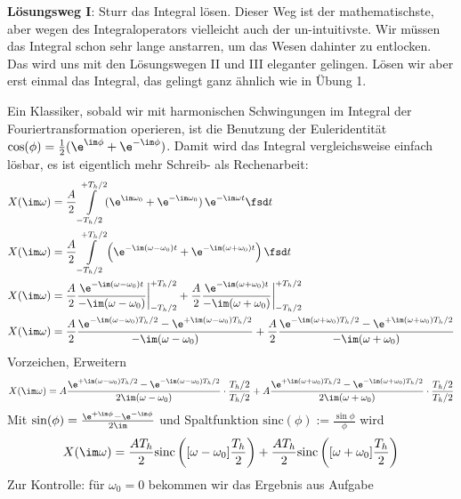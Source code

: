 %
%
%
\begin{ExCalc}
\textbf{Lösungsweg I}: Sturr das Integral lösen.
Dieser Weg ist der mathematischste, aber wegen des Integraloperators vielleicht auch
der un-intuitivste. Wir müssen das Integral schon sehr lange anstarren, um das Wesen
dahinter zu entlocken. Das wird uns mit den Lösungswegen II und III eleganter gelingen.
Lösen wir aber erst einmal das Integral, das gelingt ganz ähnlich wie in Übung 1.

Ein Klassiker, sobald wir mit harmonischen Schwingungen im Integral
der Fouriertransformation operieren, ist die Benutzung der Euleridentität
$\cos(\phi) = \frac{1}{2}(\e^{\im \phi} + \e^{-\im \phi})$.
Damit wird das Integral vergleichsweise einfach lösbar, es ist eigentlich mehr
Schreib- als Rechenarbeit:
\begin{align}
&X(\im \omega) = \frac{A}{2} \int\limits_{-T_h/2}^{+T_h/2} (\e^{\im \omega_0} + \e^{-\im \omega_0}) \, \e^{-\im \omega t} \fsd t
\\
&X(\im \omega) = \frac{A}{2}\int\limits_{-T_h/2}^{+T_h/2} \left(\e^{-\im (\omega-\omega_0) t} + \e^{-\im (\omega+\omega_0) t} \right) \fsd t
\\
&X(\im \omega) =
\frac{A}{2} \frac{\e^{-\im (\omega-\omega_0) t}}{-\im (\omega-\omega_0)}\bigg|_{-T_h/2}^{+T_h/2}
+\frac{A}{2} \frac{\e^{-\im (\omega+\omega_0) t}}{-\im (\omega+\omega_0)}\bigg|_{-T_h/2}^{+T_h/2}
\\
&X(\im \omega) =
\frac{A}{2} \frac{\e^{-\im (\omega-\omega_0) T_h/2} - \e^{+\im (\omega-\omega_0) T_h/2}}{-\im (\omega-\omega_0)}
+\frac{A}{2} \frac{\e^{-\im (\omega+\omega_0) T_h/2} - \e^{+\im (\omega+\omega_0) T_h/2}}{-\im (\omega+\omega_0)}
\end{align}
%
Vorzeichen, Erweitern
%
\begin{align}
X(\im \omega) =
A\frac{\e^{+\im (\omega-\omega_0) T_h/2} - \e^{-\im (\omega-\omega_0) T_h/2}}{2\im (\omega-\omega_0)} \cdot \frac{T_h/2}{T_h/2}
+A \frac{\e^{+\im (\omega+\omega_0) T_h/2} - \e^{-\im (\omega+\omega_0) T_h/2}}{2\im (\omega+\omega_0)} \cdot \frac{T_h/2}{T_h/2}
\end{align}
%
Mit $\sin(\phi) = \frac{\e^{+\im \phi}-\e^{-\im \phi}}{2\im}$ und Spaltfunktion
$\mathrm{sinc}(\phi):=\frac{\sin \phi}{\phi}$ wird
\begin{align}
\label{eq:610482EF57_Xjw}
X(\im \omega) =
\frac{A T_h}{2} \mathrm{sinc}\left([\omega-\omega_0] \frac{T_h}{2}\right) +
\frac{A T_h}{2} \mathrm{sinc}\left([\omega+\omega_0] \frac{T_h}{2}\right)
\end{align}
Zur Kontrolle: für $\omega_0 = 0$ bekommen wir das Ergebnis aus Aufgabe

\end{ExCalc}
